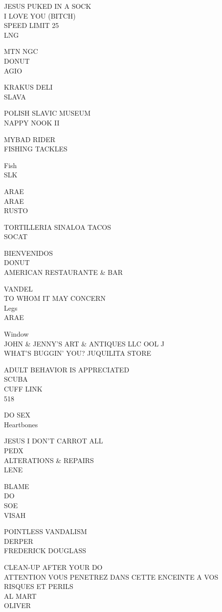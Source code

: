 \documentclass[10pt,letterpaper]{article}
\begin{document}
JESUS PUKED IN A SOCK\\
I LOVE YOU (BITCH)\\
SPEED LIMIT 25\\
LNG

MTN NGC\\
DONUT\\
AGIO

KRAKUS DELI\\
SLAVA

POLISH SLAVIC MUSEUM\\
NAPPY NOOK II

MYBAD RIDER\\
FISHING TACKLES

Fish\\
SLK

ARAE\\
ARAE\\
RUSTO

TORTILLERIA SINALOA TACOS\\
SOCAT

BIENVENIDOS\\
DONUT\\
AMERICAN RESTAURANTE \& BAR

VANDEL\\
TO WHOM IT MAY CONCERN\\
Legs\\
ARAE

Window\\
JOHN \& JENNY'S ART \& ANTIQUES LLC OOL J\\
WHAT'S BUGGIN' YOU? JUQUILITA STORE

ADULT BEHAVIOR IS APPRECIATED\\
SCUBA\\
CUFF LINK\\
518

DO SEX\\
Heartbones

JESUS I DON'T CARROT ALL\\
PEDX\\
ALTERATIONS \& REPAIRS\\
LENE

BLAME\\
DO\\
SOE\\
VISAH

POINTLESS VANDALISM\\
DERPER\\
FREDERICK DOUGLASS

CLEAN{-}UP AFTER YOUR DO\\
ATTENTION VOUS PENETREZ DANS CETTE ENCEINTE A VOS RISQUES ET PERILS\\
AL MART\\
OLIVER
\end{document}
